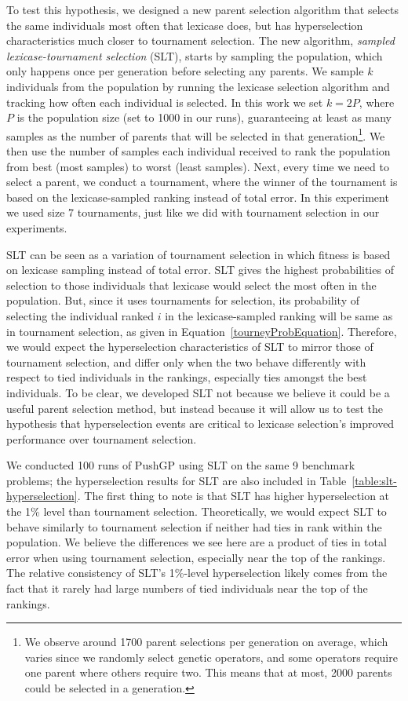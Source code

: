 \documentclass{sig-alternate}
\newcommand{\definition}[1]{\textit{#1}}
\begin{document}
To test this hypothesis, we designed a new parent selection algorithm that selects the same individuals most often that lexicase does, but has hyperselection characteristics much closer to tournament selection. The new algorithm, \definition{sampled lexicase-tournament selection} (SLT), starts by sampling the population, which only happens once per generation before selecting any parents. We sample $k$ individuals from the population by running the lexicase selection algorithm and tracking how often each individual is selected. In this work we set $k = 2P$, where $P$ is the population size (set to 1000 in our runs), guaranteeing at least as many samples as the number of parents that will be selected in that generation\footnote{We observe around 1700 parent selections per generation on average, which varies since we randomly select genetic operators, and some operators require one parent where others require two. This means that at most, 2000 parents could be selected in a generation.}. We then use the number of samples each individual received to rank the population from best (most samples) to worst (least samples). Next, every time we need to select a parent, we conduct a tournament, where the winner of the tournament is based on the lexicase-sampled ranking instead of total error. In this experiment we used size 7 tournaments, just like we did with tournament selection in our experiments.

SLT can be seen as a variation of tournament selection in which fitness is based on lexicase sampling instead of total error.
SLT gives the highest probabilities of selection to those individuals that lexicase would select the most often in the population. But, since it uses tournaments for selection, its probability of selecting the individual ranked $i$ in the lexicase-sampled ranking will be same as in tournament selection, as given in Equation~\ref{tourneyProbEquation}. Therefore, we would expect the hyperselection characteristics of SLT to mirror those of tournament selection, and differ only when the two behave differently with respect to tied individuals in the rankings, especially ties amongst the best individuals. To be clear, we developed SLT not because we believe it could be a useful parent selection method, but instead because it will allow us to test the hypothesis that hyperselection events are critical to lexicase selection's improved performance over tournament selection.

We conducted 100 runs of PushGP using SLT on the same 9 benchmark problems; the hyperselection results for SLT are also included in Table~\ref{table:slt-hyperselection}. The first thing to note is that SLT has higher hyperselection at the 1\% level than tournament selection. Theoretically, we would expect SLT to behave similarly to tournament selection if neither had ties in rank within the population. We believe the differences we see here are a product of ties in total error when using tournament selection, especially near the top of the rankings. The relative consistency of SLT's 1\%-level hyperselection likely comes from the fact that it rarely had large numbers of tied individuals near the top of the rankings.
\end{document}
